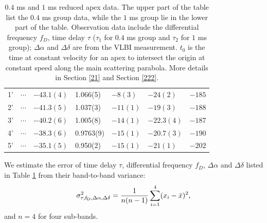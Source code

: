 \documentclass[useAMS,usenatbib]{mn2e}
\begin{document}
\begin{table}
\begin{tabular}{c|llllll}
1'&$ \cdots$ & $-43.1(4)$      & 1.066(5)    & $-8(3)$     & $-24(2)$   & $-185$   \\
2'&$\cdots$ & $-41.3(5)$    & 1.037(3)   & $-11(1)$     & $-19(3)$   & $-188$                                   \\
3'&$\cdots$ & $-40.2(6)$  & 1.005(8)    & $-14(1)$       & $-22.3(4)$  & $-187$                                   \\
4'&$\cdots$ & $-38.3(6)$  & 0.9763(9)   & $-15(1)$       & $-20.7(3)$  & $-190$                                    \\
5'&$\cdots$& $-35.1(5)$  & 0.950(2)   & $-15(1)$  & $-21(1)$   &$-202$                                   \\
 \hline                                 
\end{tabular}
\caption{ $0.4$ ms and $1$ ms reduced apex data. 
The upper part of the table list the $0.4$ ms group data, while the $1$ ms group lie in the lower part of the table. 
Observation data include the differential frequency $f_D$, time delay
$\tau$ ($\tau_1$ for $0.4$ ms group and $\tau_2$ for $1$ ms group);
$\Delta\alpha$ and $\Delta\delta$ are from the VLBI measurement. 
$t_0$ is the time at constant velocity for an apex to intersect the
origin at constant speed along the main scattering parabola.  More
details in Section \ref{21} and Section \ref{222}.
}
\label{table:apex}
\end{table}
We estimate the error of time delay $\tau$, differential frequency
$f_D$, $\Delta\alpha$ and $\Delta\delta$  listed in Table
\ref{table:apex} from their band-to-band variance:
\begin{equation}
\sigma^2_{\rm \tau, f_D,\Delta\alpha, \Delta\delta} = \frac{1}{n(n-1)}\sum^{4}_{i=1}(x_i-\bar{x})^2,
\end{equation}
and $n=4$ for four sub-bands.

\end{document}
